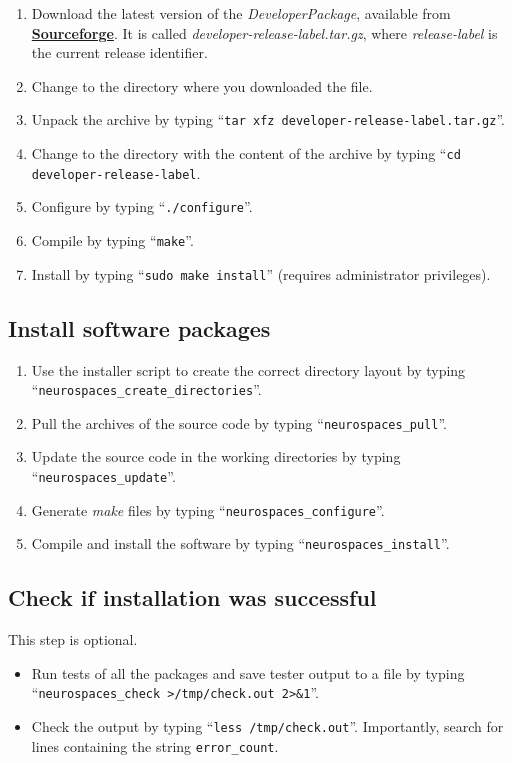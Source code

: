 \documentclass[12pt]{article}
\begin{document}
\begin{enumerate}
   \item Download the latest version of the {\it DeveloperPackage}, available from \href{http://sourceforge.net/projects/neurospaces/files/}{\bf Sourceforge}. It is called {\it developer-release-label.tar.gz}, where {\it release-label} is the current release identifier.
   \item Change to the directory where you downloaded the file.
   \item Unpack the archive by typing ``{\tt tar xfz developer-release-label.tar.gz}''.
   \item Change to the directory with the content of the archive by typing ``{\tt cd developer-release-label}.
   \item Configure by typing ``{\tt ./configure}''.
   \item Compile by typing ``{\tt make}''.
   \item Install by typing ``{\tt sudo make install}''  (requires administrator privileges). 
\end{enumerate}

\subsection*{Install software packages}

\begin{enumerate}
   \item Use the installer script to create the correct directory layout by typing ``{\tt neurospaces\_create\_directories}''.
   \item Pull the archives of the source code by typing ``{\tt neurospaces\_pull}''.
   \item Update the source code in the working directories by typing ``{\tt neurospaces\_update}''.
   \item Generate {\it make} files by typing ``{\tt neurospaces\_configure}''.
   \item Compile and install the software by typing ``{\tt neurospaces\_install}''.
\end{enumerate}

\subsection*{Check if installation was successful}

This step is optional.
\begin{itemize}
   \item[] Run tests of all the packages and save tester output to a file  by typing ``{\tt neurospaces\_check >/tmp/check.out 2>\&1}''.
   \item[] Check the output by typing ``{\tt less /tmp/check.out}''. Importantly, search for lines containing the string {\tt error\_count}.
\end{itemize}
 
\end{document}
